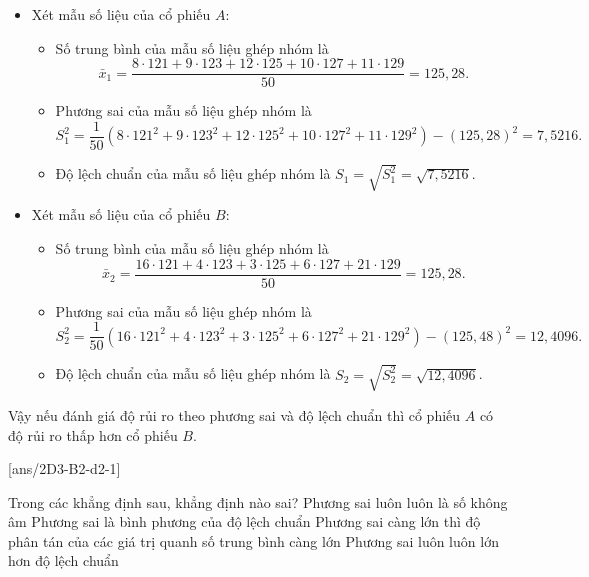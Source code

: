 \begin{vd}
{\begin{center}
\begin{tabular}{|c|c|c|c|c|c|}
				\hline
			\end{tabular}
		\end{center}
		\begin{itemize}
			\item Xét mẫu số liệu của cổ phiếu $A$:
			      \begin{itemize}
				      \item Số trung bình của mẫu số liệu ghép nhóm là
				            $$
					            \bar{x}_1=\dfrac{8 \cdot 121+9\cdot 123+12 \cdot 125+10\cdot 127+11\cdot 129}{50}=125,28.
				            $$
				      \item Phương sai của mẫu số liệu ghép nhóm là
				            $$
					            S_1^2=\dfrac{1}{50}\left(8 \cdot 121^2+9 \cdot 123^2+12 \cdot 125^2+10 \cdot 127^2+11 \cdot 129^2\right)-(125,28)^2=7,5216.
				            $$
				      \item Độ lệch chuẩn của mẫu số liệu ghép nhóm là $S_1=\sqrt{S_1^2}=\sqrt{7,5216}$.
			      \end{itemize}
			\item Xét mẫu số liệu của cổ phiếu $B$:
			      \begin{itemize}
				      \item Số trung bình của mẫu số liệu ghép nhóm là
				            $$
					            \bar{x}_2=\dfrac{16\cdot 121+4\cdot 123+3\cdot 125+6\cdot 127+21\cdot 129}{50}=125,28.
				            $$
				      \item Phương sai của mẫu số liệu ghép nhóm là
				            $$
					            S_2^2=\dfrac{1}{50}\left(16\cdot 121^2+4\cdot 123^2+3 \cdot 125^2+6 \cdot 127^2+21\cdot 129^2\right)-(125,48)^2=12,4096.$$
				      \item Độ lệch chuẩn của mẫu số liệu ghép nhóm là $S_2=\sqrt{S_2^2}=\sqrt{12,4096}$.
			      \end{itemize}
		\end{itemize}
		Vậy nếu đánh giá độ rủi ro theo phương sai và độ lệch chuẩn thì cổ phiếu $A$ có độ rủi ro thấp hơn cổ phiếu $B$.
	}
\end{vd}
\baitaptn
\setcounter{ex}{0}
[ans/2D3-B2-d2-1]
\begin{ex}
	Trong các khẳng định sau, khẳng định nào sai?
	\choice
	{Phương sai luôn luôn là số không âm}
	{Phương sai là bình phương của độ lệch chuẩn}
	{Phương sai càng lớn thì độ phân tán của các giá trị quanh số trung bình càng lớn}
	{\True Phương sai luôn luôn lớn hơn độ lệch chuẩn}
\end{ex}

